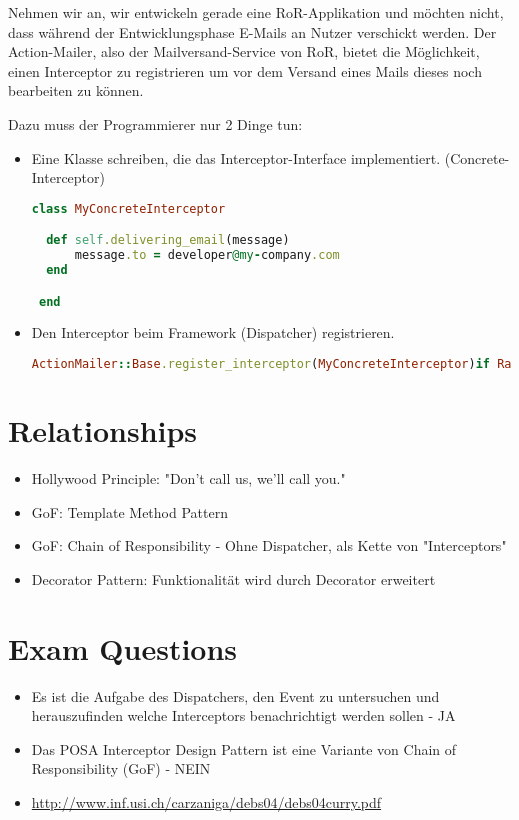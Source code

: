 Nehmen wir an, wir entwickeln gerade eine RoR-Applikation und möchten nicht, dass während der Entwicklungsphase E-Mails an Nutzer verschickt werden. Der Action-Mailer, also der Mailversand-Service von RoR, bietet die Möglichkeit, einen Interceptor zu registrieren um vor dem Versand eines Mails dieses noch bearbeiten zu können.

Dazu muss der Programmierer nur 2 Dinge tun:
\begin{itemize}
    \item{Eine Klasse schreiben, die das Interceptor-Interface implementiert. (Concrete-Interceptor)
      \begin{lstlisting}[language=Ruby]
class MyConcreteInterceptor

  def self.delivering_email(message)
      message.to = developer@my-company.com
  end

 end\end{lstlisting}
}
    \item{Den Interceptor beim Framework (Dispatcher) registrieren.
      \begin{lstlisting}[language=Ruby]
ActionMailer::Base.register_interceptor(MyConcreteInterceptor)if Rails.env.development?\end{lstlisting}
}

  \end{itemize}


\section{Relationships}
\begin{itemize}
  \item Hollywood Principle: "Don't call us, we'll call you."
  \item GoF: Template Method Pattern
  \item GoF: Chain of Responsibility - Ohne Dispatcher, als Kette von "Interceptors"
  \item Decorator Pattern: Funktionalität wird durch Decorator erweitert
\end{itemize}

\section{Exam Questions}
\begin{itemize}
  \item Es ist die Aufgabe des Dispatchers, den Event zu untersuchen und herauszufinden welche Interceptors benachrichtigt werden sollen - JA
  \item Das POSA Interceptor Design Pattern ist eine Variante von Chain of Responsibility (GoF) - NEIN
\end{itemize}

\begin{additional}[Links]
  \begin{itemize}
    \item \url{http://www.inf.usi.ch/carzaniga/debs04/debs04curry.pdf}
  \end{itemize}
\end{additional}

